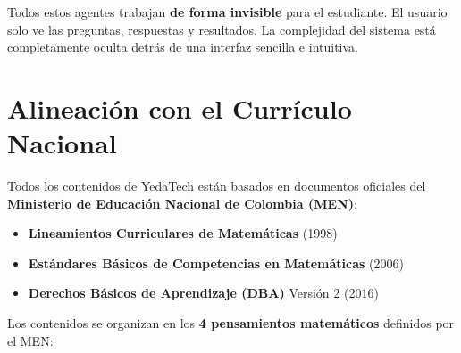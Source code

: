 \documentclass[12pt, a4paper]{article}
\begin{document}
\begin{center}
\end{center}

\begin{tipbox}
Todos estos agentes trabajan \textbf{de forma invisible} para el estudiante. El usuario solo ve las preguntas, respuestas y resultados. La complejidad del sistema está completamente oculta detrás de una interfaz sencilla e intuitiva.
\end{tipbox}

\section{Alineación con el Currículo Nacional}

Todos los contenidos de YedaTech están basados en documentos oficiales del \textbf{Ministerio de Educación Nacional de Colombia (MEN)}:

\begin{itemize}[itemsep=5pt]
    \item \textbf{Lineamientos Curriculares de Matemáticas} (1998)
    \item \textbf{Estándares Básicos de Competencias en Matemáticas} (2006)
    \item \textbf{Derechos Básicos de Aprendizaje (DBA)} Versión 2 (2016)
\end{itemize}

Los contenidos se organizan en los \textbf{4 pensamientos matemáticos} definidos por el MEN:
\end{document}
